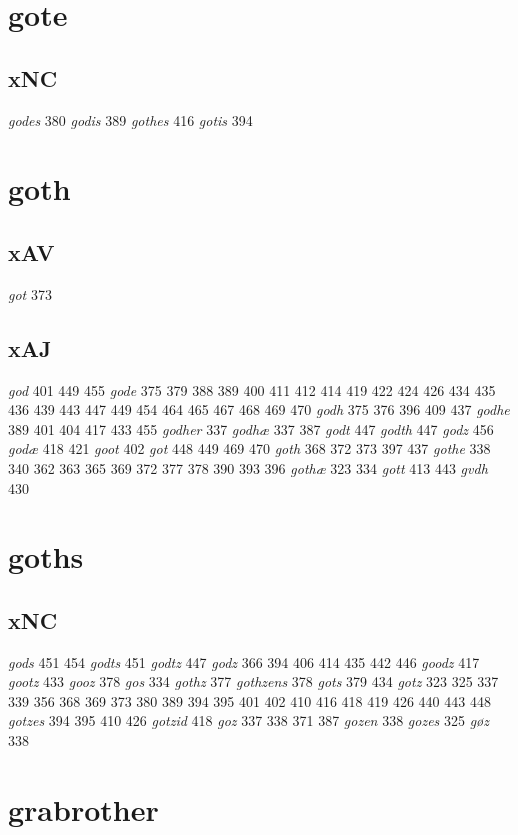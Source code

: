 \documentclass[a4paper,twocolumn]{article}
\begin{document}
\section{gote}
\label{sec:orgf8cd7ef}
\subsection{xNC}
\label{sec:orgc2afa90}
\emph{godes} 380 \emph{godis} 389 \emph{gothes} 416 \emph{gotis} 394 
\section{goth}
\label{sec:orge04c182}
\subsection{xAV}
\label{sec:orge072a65}
\emph{got} 373 
\subsection{xAJ}
\label{sec:orgb3e2f03}
\emph{god} 401 449 455 \emph{gode} 375 379 388 389 400 411 412 414 419 422 424 426 434 435 436 439 443 447 449 454 464 465 467 468 469 470 \emph{godh} 375 376 396 409 437 \emph{godhe} 389 401 404 417 433 455 \emph{godher} 337 \emph{godhæ} 337 387 \emph{godt} 447 \emph{godth} 447 \emph{godz} 456 \emph{godæ} 418 421 \emph{goot} 402 \emph{got} 448 449 469 470 \emph{goth} 368 372 373 397 437 \emph{gothe} 338 340 362 363 365 369 372 377 378 390 393 396 \emph{gothæ} 323 334 \emph{gott} 413 443 \emph{gvdh} 430 
\section{goths}
\label{sec:orgedd5462}
\subsection{xNC}
\label{sec:org150d48f}
\emph{gods} 451 454 \emph{godts} 451 \emph{godtz} 447 \emph{godz} 366 394 406 414 435 442 446 \emph{goodz} 417 \emph{gootz} 433 \emph{gooz} 378 \emph{gos} 334 \emph{gothz} 377 \emph{gothzens} 378 \emph{gots} 379 434 \emph{gotz} 323 325 337 339 356 368 369 373 380 389 394 395 401 402 410 416 418 419 426 440 443 448 \emph{gotzes} 394 395 410 426 \emph{gotzid} 418 \emph{goz} 337 338 371 387 \emph{gozen} 338 \emph{gozes} 325 \emph{gøz} 338 
\section{grabrother}
\label{sec:org41d4ad5}
\end{document}
